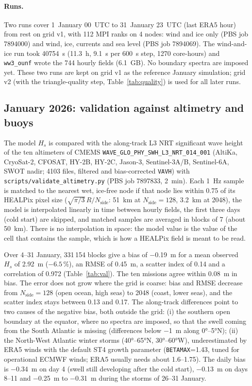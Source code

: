 \documentclass[11pt,a4paper]{article}
\newcommand{\nside}{N_{\mathrm{side}}}
\begin{document}
\paragraph{Runs.} Two runs cover 1~January 00~UTC to 31~January 23~UTC
(last ERA5 hour) from rest on grid v1, with 112 MPI ranks on 4 nodes:
wind and ice only (PBS job 7894000) and wind, ice, currents and sea level
(PBS job 7894069). The wind-and-ice run took \SI{40754}{s} (\SI{11.3}{h},
\SI{9.1}{s} per \SI{600}{s} step, 1270 core-hours) and \texttt{ww3\_ounf}
wrote the 744 hourly fields (\SI{6.1}{GB}). No boundary spectra are imposed
yet. These two runs are kept on grid v1 as the reference January
simulation; grid v2 (with the triangle-quality step,
Table~\ref{tab:quality}) is used for all later runs.

\subsection{January 2026: validation against altimetry and buoys}\label{sec:validation}
The model $H_s$ is compared with the along-track L3 NRT significant wave
height of the ten altimeters of CMEMS
\texttt{WAVE\_GLO\_PHY\_SWH\_L3\_NRT\_014\_001} (AltiKa, CryoSat-2, CFOSAT,
HY-2B, HY-2C, Jason-3, Sentinel-3A/B, Sentinel-6A, SWOT nadir; 4103 files,
filtered and bias-corrected \texttt{VAVH}) with
\texttt{scripts/validate\_altimetry.py} (PBS job 7897833, \SI{2}{min}).
Each \SI{1}{Hz} sample is matched to the nearest wet, ice-free node if that
node lies within 0.75 of its HEALPix pixel size
($\sqrt{\pi/3}\,R/\nside$: \SI{51}{km} at $\nside=128$, \SI{3.2}{km} at
2048), the model is interpolated linearly in time between hourly fields,
the first three days (cold start) are skipped, and matched samples are
averaged in blocks of 7 (about \SI{50}{km}). There is no interpolation in
space: the model value is the value of the cell that contains the sample,
which is how a HEALPix field is meant to be read.

Over 4--31 January, 331\,154 blocks give a bias of \SI{-0.19}{m} for a mean
observed $H_s$ of \SI{2.92}{m} ($-6.5$\,\%), an RMSE of \SI{0.45}{m}, a
scatter index of 0.14 and a correlation of 0.972 (Table~\ref{tab:val}).
The ten missions agree within
\SI{0.08}{m} in bias. The error does not grow where the grid is coarse:
bias and RMSE decrease from $\nside=128$ (open ocean, high seas) to 2048
(coast, lower seas), and the scatter index stays between 0.13 and 0.17.
The along-track differences point to two causes
of the negative bias, both outside the grid: (i) the southern open boundary
at the equator, where no spectra are imposed, so that the swell coming
from the South Atlantic is missing (differences below \SI{-1}{m} along
\ang{0}--\ang{5}N); (ii) the North-West Atlantic winter storms
(\ang{40}--\ang{65}N, \ang{30}--\ang{60}W), underestimated by
ERA5 winds with the default ST4 growth parameter (\texttt{BETAMAX}=1.43,
tuned for operational ECMWF winds; ERA5 usually needs about 1.6--1.75).
The daily bias is \SI{-0.34}{m} on day 4 (swell still developing after the
cold start), \SI{-0.13}{m} on days 8--11 and \SI{-0.25}{m} to
\SI{-0.31}{m} during the storms of 26--31 January.
\end{document}
